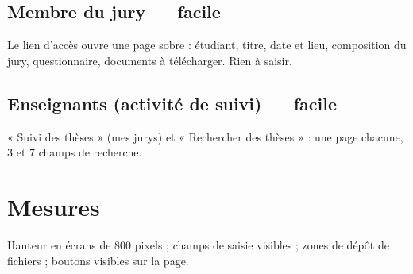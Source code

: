 \documentclass[11pt,a4paper]{article}
\begin{document}
\subsection{Membre du jury --- facile}

Le lien d'accès ouvre une page sobre : étudiant, titre, date et lieu, composition du jury,
questionnaire, documents à télécharger. Rien à saisir.

\subsection{Enseignants (activité de suivi) --- facile}

« Suivi des thèses » (mes jurys) et « Rechercher des thèses » : une page chacune, 3 et 7 champs de
recherche.

\section{Mesures}

Hauteur en écrans de 800 pixels ; champs de saisie visibles ; zones de dépôt de fichiers ;
boutons visibles sur la page.
\end{document}
